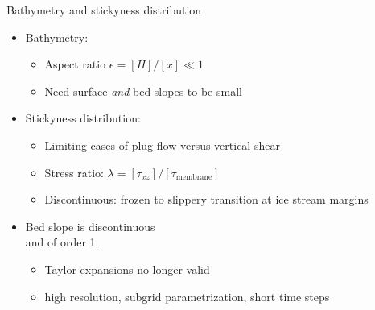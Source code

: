 \begin{frame}{Bathymetry and stickyness distribution}
  \begin{itemize}
  \item Bathymetry:
    \begin{itemize}
    \item Aspect ratio $\epsilon = [H]/[x] \ll 1$
    \item Need surface \emph{and} bed slopes to be small
    \end{itemize}
  \item Stickyness distribution:
    \begin{itemize}
    \item Limiting cases of plug flow versus vertical shear
    \item Stress ratio: $\lambda = [\tau_{xz}]/[\tau_{\text{membrane}}]$
    \item Discontinuous: frozen to slippery transition at ice stream margins
    \end{itemize}
  \item<2> \alert{\LARGE Bed slope is discontinuous\\ and of order 1.}
    \begin{itemize}
    \item Taylor expansions no longer valid
    \item high resolution, subgrid parametrization, short time steps
    \end{itemize}
  \end{itemize}
\end{frame}
